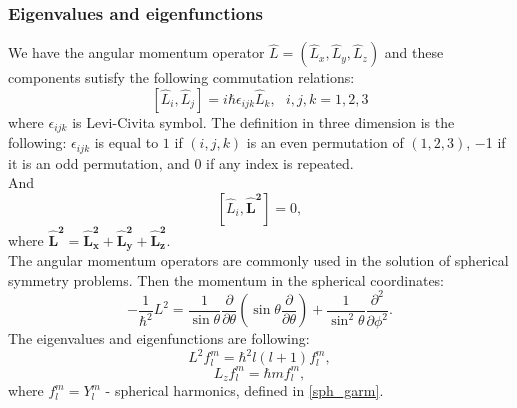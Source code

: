 \documentclass[a4paper, 14pt]{article}
\begin{document}
\subsubsection{Eigenvalues and eigenfunctions}
We have the angular momentum operator $\hat L = (\hat L_x,\hat L_y, \hat L_z)$ and these components sutisfy the following commutation relations:
\begin{equation}\label{comm_L}
	[\hat L_i, \hat L_j] =i \hbar \epsilon_{ijk}  \hat L_k, ~~~i, j, k =1,2,3
\end{equation}
where $\epsilon_{ijk}$ is Levi-Civita symbol. The definition in three dimension is the following:  $\epsilon_{ijk}$ is equal to $1$ if $(i, j, k)$ is an even permutation of $(1, 2, 3)$,  $-$1 if it is an odd permutation, and  $0$ if any index is repeated.\\
And 
$$[\hat L_i, \boldsymbol{\hat L^2}] = 0, $$
where $\mathbf{\hat L^2 = \hat L_x^2+\hat L_y^2+\hat L_z^2} .$\\
The angular momentum operators are commonly used in the solution of spherical symmetry problems. Then the momentum in the spherical coordinates: 
$$-\frac{1}{\hbar^2}L^2=\frac{1}{\sin \theta}\frac{\partial}{\partial \theta}(\sin \theta \frac{\partial}{\partial \theta})+\frac{1}{\sin^2 \theta}\frac{\partial^2}{\partial \phi^2}.$$
The eigenvalues and eigenfunctions are following:
$$L^2 f_l^m = \hbar^2l(l+1) f_l^m,$$
$$L_z f_l^m = \hbar m f_l^m,$$
where $f_l^m = Y_l^m$ - spherical harmonics, defined in \eqref{sph_garm}.
\end{document}

